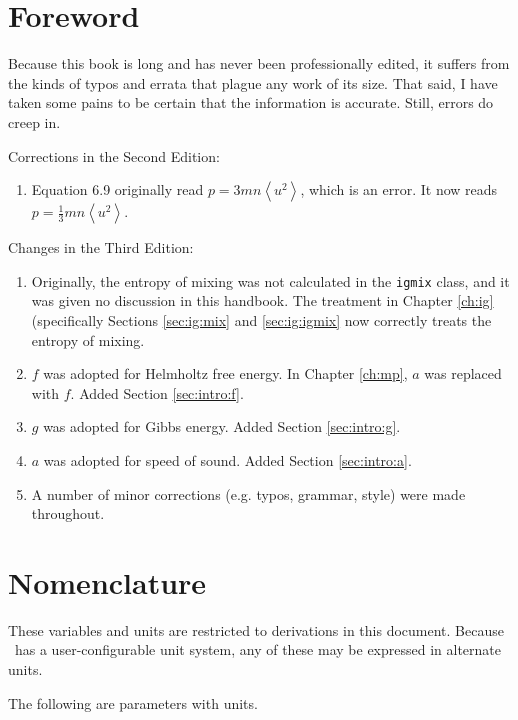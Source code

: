 \section*{Foreword}\label{sec:foreword}

Because this book is long and has never been professionally edited, it suffers from the kinds of typos and errata that plague any work of its size.  That said, I have taken some pains to be certain that the information is accurate.  Still, errors do creep in.

Corrections in the Second Edition:
\begin{enumerate}
\item Equation 6.9 originally read $p=3mn\left<u^2\right>$, which is an error. It now reads $p=\frac{1}{3}mn\left<u^2\right>$.
\end{enumerate}

Changes in the Third Edition:
\begin{enumerate}
\item Originally, the entropy of mixing was not calculated in the \texttt{igmix} class, and it was given no discussion in this handbook. The treatment in Chapter \ref{ch:ig} (specifically Sections \ref{sec:ig:mix} and \ref{sec:ig:igmix} now correctly treats the entropy of mixing.
\item $f$ was adopted for Helmholtz free energy.  In Chapter \ref{ch:mp}, $a$ was replaced with $f$. Added Section \ref{sec:intro:f}.
\item $g$ was adopted for Gibbs energy.  Added Section \ref{sec:intro:g}.
\item $a$ was adopted for speed of sound.  Added Section \ref{sec:intro:a}.
\item A number of minor corrections (e.g. typos, grammar, style) were made throughout.
\end{enumerate}

\section*{Nomenclature}\label{sec:nom}

These variables and units are restricted to derivations in this document.  Because \PM\ has a user-configurable unit system, any of these may be expressed in alternate units.  

The following are parameters with units.

